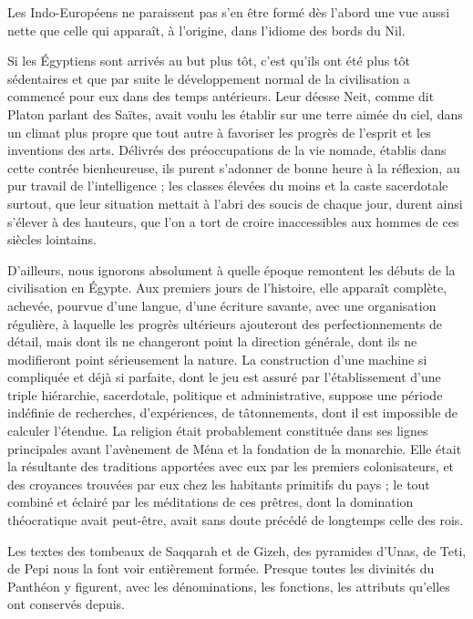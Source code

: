 \documentclass[a4paper, 11pt, oneside]{article}
\begin{document}
Les Indo-Européens ne paraissent pas s'en être formé dès l'abord une vue aussi nette que celle qui apparaît, à l'origine, dans l'idiome des bords du Nil.

Si les Égyptiens sont arrivés au but plus tôt, c'est qu'ils ont été plus tôt sédentaires et que par suite le développement normal de la civilisation a commencé pour eux dans des temps antérieurs. Leur déesse Neit, comme dit Platon parlant des Saïtes, avait voulu les établir sur une terre aimée du ciel, dans un climat plus propre que tout autre à favoriser les progrès de l'esprit et les inventions des arts. Délivrés des préoccupations de la vie nomade, établis dans cette contrée bienheureuse, ils purent s'adonner de bonne heure à la réflexion, au pur travail de l'intelligence ; les classes élevées du moins et la caste sacerdotale surtout, que leur situation mettait à l'abri des soucis de chaque jour, durent ainsi s'élever à des hauteurs, que l'on a tort de croire inaccessibles aux hommes de ces siècles lointains.

D'ailleurs, nous ignorons absolument à quelle époque remontent les débuts de la civilisation en Égypte. Aux premiers jours de l'histoire, elle apparaît complète, achevée, pourvue d'une langue, d’une écriture savante, avec une organisation régulière, à laquelle les progrès ultérieurs ajouteront des perfectionnements de détail, mais dont ils ne changeront point la direction générale, dont ils ne modifieront point sérieusement la nature. La construction d'une machine si compliquée et déjà si parfaite, dont le jeu est assuré par l'établissement d'une triple hiérarchie, sacerdotale, politique et administrative, suppose une période indéfinie de recherches, d'expériences, de tâtonnements, dont il est impossible de calculer l'étendue. La religion était probablement constituée dans ses lignes principales avant l'avènement de Ména et la fondation de la monarchie. Elle était la résultante des traditions apportées avec eux par les premiers colonisateurs, et des croyances trouvées par eux chez les habitants primitifs du pays ; le tout combiné et éclairé par les méditations de ces prêtres, dont la domination théocratique avait peut-être, avait sans doute précédé de longtemps celle des rois.

Les textes des tombeaux de Saqqarah et de Gizeh, des pyramides d'Unas, de Teti, de Pepi nous la font voir entièrement formée. Presque toutes les divinités du Panthéon y figurent, avec les dénominations, les fonctions, les attributs qu'elles ont conservés depuis.
\end{document}

